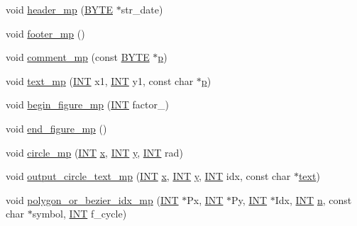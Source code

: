 \begin{DoxyCompactItemize}
\item 
void \mbox{\hyperlink{classmp__graphics_ad08252e9be57fd9d484a80a1c3602969}{header\+\_\+mp}} (\mbox{\hyperlink{galois_8h_ab6cc7b4aeb6ea31aba2b3fbfc83ff5e6}{B\+Y\+TE}} $\ast$str\+\_\+date)
\item 
void \mbox{\hyperlink{classmp__graphics_a3667f25d3a90de957ede28f7aa95ac56}{footer\+\_\+mp}} ()
\item 
void \mbox{\hyperlink{classmp__graphics_a8e0c07a23472ca2100c2aef7ee6bcc0d}{comment\+\_\+mp}} (const \mbox{\hyperlink{galois_8h_ab6cc7b4aeb6ea31aba2b3fbfc83ff5e6}{B\+Y\+TE}} $\ast$\mbox{\hyperlink{alphabet2_8_c_a533391314665d6bf1b5575e9a9cd8552}{p}})
\item 
void \mbox{\hyperlink{classmp__graphics_ad30aeb75639e84d876dade51faa50bee}{text\+\_\+mp}} (\mbox{\hyperlink{galois_8h_a09fddde158a3a20bd2dcadb609de11dc}{I\+NT}} x1, \mbox{\hyperlink{galois_8h_a09fddde158a3a20bd2dcadb609de11dc}{I\+NT}} y1, const char $\ast$\mbox{\hyperlink{alphabet2_8_c_a533391314665d6bf1b5575e9a9cd8552}{p}})
\item 
void \mbox{\hyperlink{classmp__graphics_aab98691d8a4a65a5ac8ed06e8f71c640}{begin\+\_\+figure\+\_\+mp}} (\mbox{\hyperlink{galois_8h_a09fddde158a3a20bd2dcadb609de11dc}{I\+NT}} factor\+\_)
\item 
void \mbox{\hyperlink{classmp__graphics_a9689888a580c69708ba1ead311f4cd26}{end\+\_\+figure\+\_\+mp}} ()
\item 
void \mbox{\hyperlink{classmp__graphics_af45ff3b26ab8578a58b17b3507578fc2}{circle\+\_\+mp}} (\mbox{\hyperlink{galois_8h_a09fddde158a3a20bd2dcadb609de11dc}{I\+NT}} \mbox{\hyperlink{alphabet2_8_c_a6150e0515f7202e2fb518f7206ed97dc}{x}}, \mbox{\hyperlink{galois_8h_a09fddde158a3a20bd2dcadb609de11dc}{I\+NT}} \mbox{\hyperlink{alphabet2_8_c_a0a2f84ed7838f07779ae24c5a9086d33}{y}}, \mbox{\hyperlink{galois_8h_a09fddde158a3a20bd2dcadb609de11dc}{I\+NT}} rad)
\item 
void \mbox{\hyperlink{classmp__graphics_a26ee112bf3b6577bc197456632fc5d94}{output\+\_\+circle\+\_\+text\+\_\+mp}} (\mbox{\hyperlink{galois_8h_a09fddde158a3a20bd2dcadb609de11dc}{I\+NT}} \mbox{\hyperlink{alphabet2_8_c_a6150e0515f7202e2fb518f7206ed97dc}{x}}, \mbox{\hyperlink{galois_8h_a09fddde158a3a20bd2dcadb609de11dc}{I\+NT}} \mbox{\hyperlink{alphabet2_8_c_a0a2f84ed7838f07779ae24c5a9086d33}{y}}, \mbox{\hyperlink{galois_8h_a09fddde158a3a20bd2dcadb609de11dc}{I\+NT}} idx, const char $\ast$\mbox{\hyperlink{classmp__graphics_ae92ece77cf1942bfee760d6cf854b74b}{text}})
\item 
void \mbox{\hyperlink{classmp__graphics_ac1c736f6c02abd6df696eb949c3513ac}{polygon\+\_\+or\+\_\+bezier\+\_\+idx\+\_\+mp}} (\mbox{\hyperlink{galois_8h_a09fddde158a3a20bd2dcadb609de11dc}{I\+NT}} $\ast$Px, \mbox{\hyperlink{galois_8h_a09fddde158a3a20bd2dcadb609de11dc}{I\+NT}} $\ast$Py, \mbox{\hyperlink{galois_8h_a09fddde158a3a20bd2dcadb609de11dc}{I\+NT}} $\ast$Idx, \mbox{\hyperlink{galois_8h_a09fddde158a3a20bd2dcadb609de11dc}{I\+NT}} \mbox{\hyperlink{simeon_8_c_a7f2cd26777ce0ff3fdaf8d02aacbddfb}{n}}, const char $\ast$symbol, \mbox{\hyperlink{galois_8h_a09fddde158a3a20bd2dcadb609de11dc}{I\+NT}} f\+\_\+cycle)

\end{DoxyCompactItemize}
